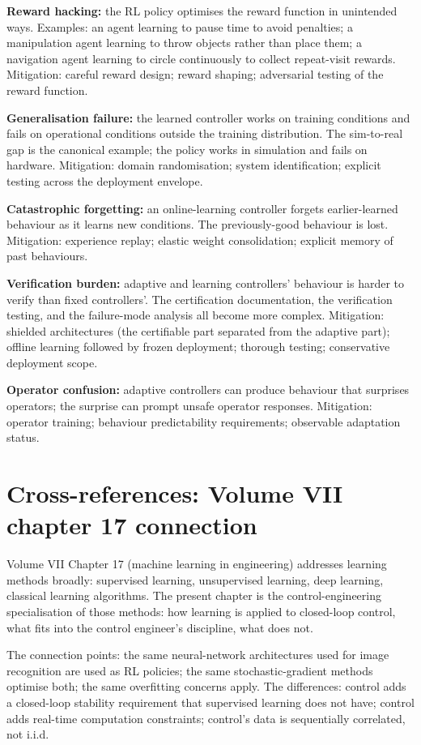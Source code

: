 \textbf{Reward hacking:} the RL policy optimises the reward function in unintended ways. Examples: an agent learning to pause time to avoid penalties; a manipulation agent learning to throw objects rather than place them; a navigation agent learning to circle continuously to collect repeat-visit rewards. Mitigation: careful reward design; reward shaping; adversarial testing of the reward function.

\textbf{Generalisation failure:} the learned controller works on training conditions and fails on operational conditions outside the training distribution. The sim-to-real gap is the canonical example; the policy works in simulation and fails on hardware. Mitigation: domain randomisation; system identification; explicit testing across the deployment envelope.

\textbf{Catastrophic forgetting:} an online-learning controller forgets earlier-learned behaviour as it learns new conditions. The previously-good behaviour is lost. Mitigation: experience replay; elastic weight consolidation; explicit memory of past behaviours.

\textbf{Verification burden:} adaptive and learning controllers' behaviour is harder to verify than fixed controllers'. The certification documentation, the verification testing, and the failure-mode analysis all become more complex. Mitigation: shielded architectures (the certifiable part separated from the adaptive part); offline learning followed by frozen deployment; thorough testing; conservative deployment scope.

\textbf{Operator confusion:} adaptive controllers can produce behaviour that surprises operators; the surprise can prompt unsafe operator responses. Mitigation: operator training; behaviour predictability requirements; observable adaptation status.

\section{Cross-references: Volume VII chapter 17 connection}

Volume VII Chapter 17 (machine learning in engineering) addresses learning methods broadly: supervised learning, unsupervised learning, deep learning, classical learning algorithms. The present chapter is the control-engineering specialisation of those methods: how learning is applied to closed-loop control, what fits into the control engineer's discipline, what does not.

The connection points: the same neural-network architectures used for image recognition are used as RL policies; the same stochastic-gradient methods optimise both; the same overfitting concerns apply. The differences: control adds a closed-loop stability requirement that supervised learning does not have; control adds real-time computation constraints; control's data is sequentially correlated, not i.i.d.

